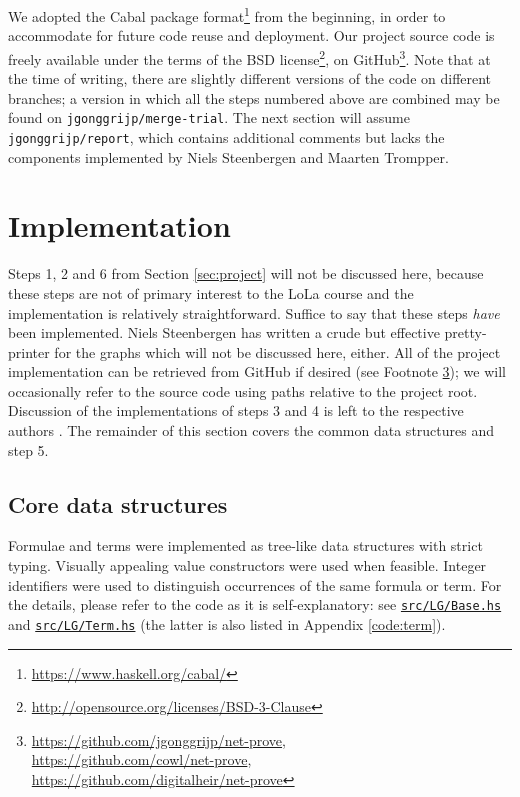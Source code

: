 \documentclass[12pt,a4paper]{article}
\newcommand{\coderef}[1]{\href{https://github.com/jgonggrijp/net-prove/blob/report/#1}{\texttt{#1}}}
\begin{document}
We adopted the Cabal package format\footnote{\url{https://www.haskell.org/cabal/}} from the beginning, in order to accommodate for future code reuse and deployment. Our project source code is freely available under the terms of the BSD license\footnote{\url{http://opensource.org/licenses/BSD-3-Clause}}, on GitHub\footnote{\url{https://github.com/jgonggrijp/net-prove},\\ \url{https://github.com/cowl/net-prove},\\ \url{https://github.com/digitalheir/net-prove}\label{ftn:github}}. Note that at the time of writing, there are slightly different versions of the code on different branches; a version in which all the steps numbered above are combined may be found on \texttt{jgonggrijp/merge-trial}. The next section will assume \texttt{jgonggrijp/report}, which contains additional comments but lacks the components implemented by Niels Steenbergen and Maarten Trompper.


\section{Implementation}

Steps 1, 2 and 6 from Section \ref{sec:project} will not be discussed here, because these steps are not of primary interest to the LoLa course and the implementation is relatively straightforward. Suffice to say that these steps \emph{have} been implemented. Niels Steenbergen has written a crude but effective pretty-printer for the graphs which will not be discussed here, either. All of the project implementation can be retrieved from GitHub if desired (see Footnote \ref{ftn:github}); we will occasionally refer to the source code using paths relative to the project root. Discussion of the implementations of steps 3 and 4 is left to the respective authors \cite{maarten,niels}. The remainder of this section covers the common data structures and step 5.


\subsection{Core data structures}

Formulae and terms were implemented as tree-like data structures with strict typing. Visually appealing value constructors were used when feasible. Integer identifiers were used to distinguish occurrences of the same formula or term. For the details, please refer to the code as it is self-ex\-plan\-a\-tory: see \coderef{src/LG/Base.hs} and \coderef{src/LG/Term.hs} (the latter is also listed in Appendix \ref{code:term}).
\end{document}
